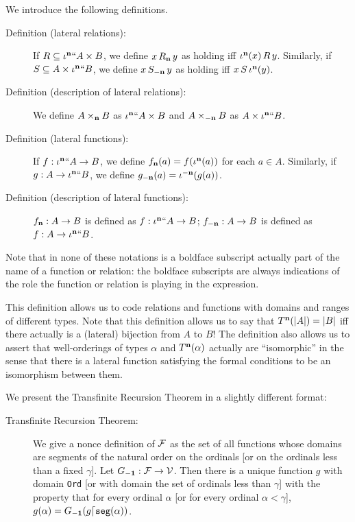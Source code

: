 \documentclass[12pt]{book}
\begin{document}
We introduce the following definitions.

\begin{description}

\item[Definition (lateral relations):] If $R \subseteq \iota^{\bf n}``A \times B$, we
define $x \,R_{\bf n}\, y$ as holding iff $\iota^{\bf n}(x) \,R\,y$.  Similarly,
if $S \subseteq A \times \iota^{\bf n}``B$, we define $x \,S_{\bf -n}\,y$ as
holding iff $x\,S\,\iota^{\bf n}(y)$.

\item[Definition (description of lateral relations):] We define $A\times_{\bf n}B$
as $\iota^{\bf n}``A\times B$ and \newline $A \times_{\bf -n}B$ as $A \times
\iota^{\bf n}``B$.

\item[Definition (lateral functions):] If $f:\iota^{\bf n}``A \rightarrow B$, we define
$f_{\bf n}(a) = f(\iota^{\bf n}(a))$ for each $a \in A$.  Similarly, if $g:A
\rightarrow \iota^{\bf n}``B$, we define $g_{\bf -n}(a) = \iota^{\bf -n}(g(a))$.

\item[Definition (description of lateral functions):]  $f_{\bf n}:A \rightarrow B$ is
defined as $f:\iota^{\bf n}``A \rightarrow B$; $f_{\bf -n}:A \rightarrow B$ is
defined as $f:A \rightarrow \iota^{\bf n}``B$.

\end{description}

Note that in none of these notations is a boldface subscript actually
part of the name of a function or relation: the boldface subscripts
are always indications of the role the function or relation is playing
in the expression.

This definition allows us to code relations and functions with domains
and ranges of different types.  Note that this definition allows us to
say that $T^{\bf n}(|A|) = |B|$ iff there actually is a (lateral) bijection
from $A$ to $B$!  The definition also allows us to assert that
well-orderings of types $\alpha$ and $T^{\bf n}(\alpha)$ actually are
``isomorphic'' in the sense that there is a lateral function
satisfying the formal conditions to be an isomorphism between them.

We present the Transfinite Recursion Theorem in a slightly different
format:

\begin{description}
\item[Transfinite Recursion Theorem:] We give a nonce definition of
$\cal F$ as the set of all functions whose domains are segments of the
natural order on the ordinals [or on the ordinals less than a fixed
$\gamma$].  Let $G_{\bf -1}:\cal F\rightarrow V$.  Then there is a
unique function $g$ with domain {\tt Ord} [or with domain the set of
ordinals less than $\gamma$] with the property that for every ordinal
$\alpha$ [or for every ordinal $\alpha<\gamma$], $g(\alpha) = G_{\bf
-1}(g \lceil {\tt seg}(\alpha))$.
\end{description}
\end{document}
